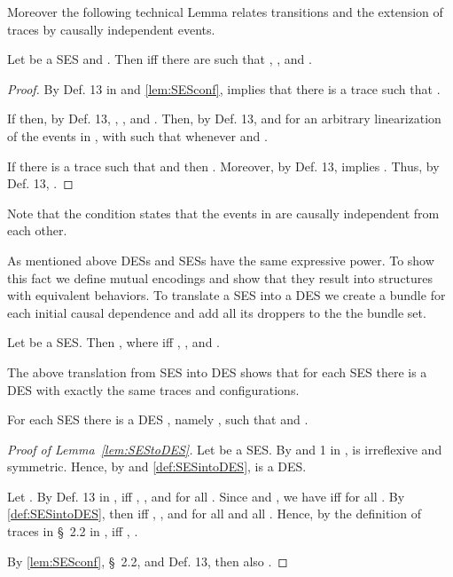 \documentclass[runningheads,a4paper]{llncs}
\begin{document}
Moreover the following technical Lemma relates transitions and the extension of traces by causally independent events.

\begin{lemma}
	\label{lem:SEStransTraces}
	Let  be a SES and .	Then  iff there are  such that , , and .
\end{lemma}

\begin{proof}
	By Def. 13 in \cite{dynamicCausality15} and \lem\ref{lem:SESconf},  implies that there is a trace  such that .

	If  then, by Def. 13, , , and . Then, by Def. 13,  and  for an arbitrary linearization  of the events in , \ie with  such that  whenever  and .
	
	If there is a trace  such that  and  then . Moreover, by Def. 13,  implies . Thus, by Def. 13, .
\end{proof}

Note that the condition  states that the events in  are causally independent from each other.

As mentioned above DESs and SESs have the same expressive power. To show this fact we define mutual encodings and show that they result into structures with equivalent behaviors. To translate a SES into a DES we create a bundle for each initial causal dependence and add all its droppers to the the bundle set.

\begin{definition}
	\label{def:SESintoDES}
	Let  be a SES.
	Then , where  iff , , and .
\end{definition}

The above translation from SES into DES shows that for each SES there is a DES with exactly the same traces and configurations.

\begin{lemma}
	\label{lem:SEStoDES}
	For each SES  there is a DES , namely , such that  and .
\end{lemma}

\begin{proof}[Proof  of Lemma~\ref{lem:SEStoDES}]
	Let  be a SES. By  and 1 in \cite{dynamicCausality15},  is irreflexive and symmetric. Hence, by  and \ref{def:SESintoDES},  is a DES.
	
	Let .
	By Def. 13 in \cite{dynamicCausality15},  iff , , and  for all .
	Since  and , we have  iff  for all .
	By \ref{def:SESintoDES}, then  iff , , and  for all  and all .
	Hence, by the definition of traces in \S~2.2 in \cite{dynamicCausality15},  iff , \ie .
	
	By \lem\ref{lem:SESconf}, \S~2.2, and Def. 13, then also .
\end{proof}
\end{document}
